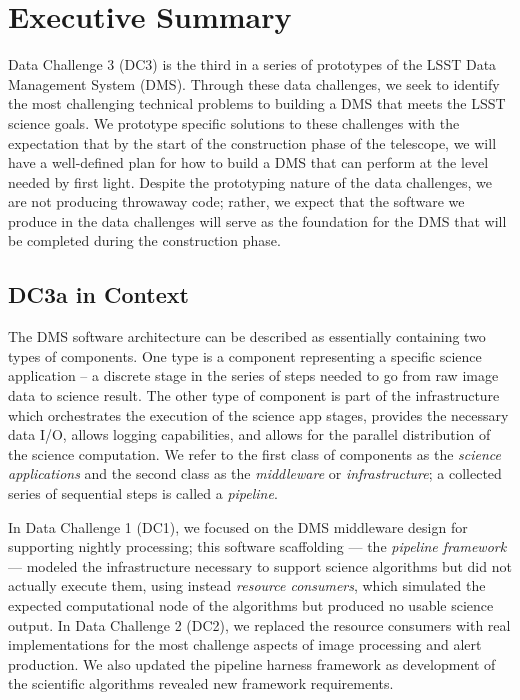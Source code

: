 \pagebreak
\section*{Executive Summary}

Data Challenge 3 (DC3) is the third in a series of prototypes of the
LSST Data Management System (DMS). Through these data challenges, we
seek to identify the most challenging technical problems to building a
DMS that meets the LSST science goals. We prototype specific solutions
to these challenges with the expectation that by the start of the
construction phase of the telescope, we will have a well-defined plan
for how to build a DMS that can perform at the level needed by first
light. Despite the prototyping nature of the data challenges, we are
not producing throwaway code; rather, we expect that the software we
produce in the data challenges will serve as the foundation for the
DMS that will be completed during the construction phase.

\subsection*{DC3a in Context}

The DMS software architecture can be described as essentially
containing two types of components. One type is a component
representing a specific science application -- a discrete stage in the
series of steps needed to go from raw image data to science
result. The other type of component is part of the infrastructure
which orchestrates the execution of the science app stages, provides
the necessary data I/O, allows logging capabilities, and allows for
the parallel distribution of the science computation. We refer to the
first class of components as the \textit{science applications} and the
second class as the \textit{middleware} or \textit{infrastructure}; a
collected series of sequential steps is called a \textit{pipeline}.

In Data Challenge 1 (DC1), we focused on the DMS middleware design
for supporting nightly processing; this software scaffolding ---
the \textit{pipeline framework} --- modeled the infrastructure
necessary to support science algorithms but did not actually execute
them, using instead \textit{resource consumers}, which simulated the
expected computational node of the algorithms but produced no usable
science output.  In Data Challenge 2 (DC2), we replaced the resource
consumers with real implementations for the most challenge aspects of
image processing and alert production. We also updated the pipeline
harness framework as development of the scientific algorithms revealed
new framework requirements.

